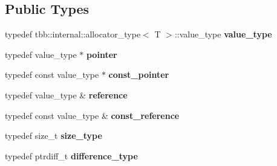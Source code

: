 \subsection*{Public Types}
\begin{DoxyCompactItemize}
\item 
\hypertarget{classtbb_1_1interface6_1_1memory__pool__allocator_a6202050e0edbded0b0534ea4be9547e0}{}typedef tbb\+::internal\+::allocator\+\_\+type$<$ T $>$\+::value\+\_\+type {\bfseries value\+\_\+type}\label{classtbb_1_1interface6_1_1memory__pool__allocator_a6202050e0edbded0b0534ea4be9547e0}

\item 
\hypertarget{classtbb_1_1interface6_1_1memory__pool__allocator_a07450f397df1af8096f31bfa8f2e1722}{}typedef value\+\_\+type $\ast$ {\bfseries pointer}\label{classtbb_1_1interface6_1_1memory__pool__allocator_a07450f397df1af8096f31bfa8f2e1722}

\item 
\hypertarget{classtbb_1_1interface6_1_1memory__pool__allocator_a972521ed466cc8140d386331a25e895a}{}typedef const value\+\_\+type $\ast$ {\bfseries const\+\_\+pointer}\label{classtbb_1_1interface6_1_1memory__pool__allocator_a972521ed466cc8140d386331a25e895a}

\item 
\hypertarget{classtbb_1_1interface6_1_1memory__pool__allocator_a83b91759effc3a452fc565ac3bb45613}{}typedef value\+\_\+type \& {\bfseries reference}\label{classtbb_1_1interface6_1_1memory__pool__allocator_a83b91759effc3a452fc565ac3bb45613}

\item 
\hypertarget{classtbb_1_1interface6_1_1memory__pool__allocator_a15abe537e2dad4132c956c08d9d0a27e}{}typedef const value\+\_\+type \& {\bfseries const\+\_\+reference}\label{classtbb_1_1interface6_1_1memory__pool__allocator_a15abe537e2dad4132c956c08d9d0a27e}

\item 
\hypertarget{classtbb_1_1interface6_1_1memory__pool__allocator_ac20767f3b7a8fcdc1aff0b0874245d3a}{}typedef size\+\_\+t {\bfseries size\+\_\+type}\label{classtbb_1_1interface6_1_1memory__pool__allocator_ac20767f3b7a8fcdc1aff0b0874245d3a}

\item 
\hypertarget{classtbb_1_1interface6_1_1memory__pool__allocator_a23267e855e2427b401b99ce4b547f83e}{}typedef ptrdiff\+\_\+t {\bfseries difference\+\_\+type}\label{classtbb_1_1interface6_1_1memory__pool__allocator_a23267e855e2427b401b99ce4b547f83e}

\end{DoxyCompactItemize}

